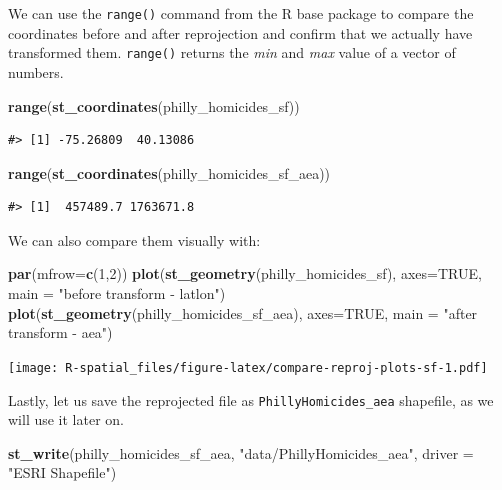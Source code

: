 \documentclass[]{book}
\newenvironment{Shaded}{\begin{snugshade}}{\end{snugshade}}
\newcommand{\KeywordTok}[1]{\textcolor[rgb]{0.13,0.29,0.53}{\textbf{#1}}}
\newcommand{\DataTypeTok}[1]{\textcolor[rgb]{0.13,0.29,0.53}{#1}}
\newcommand{\DecValTok}[1]{\textcolor[rgb]{0.00,0.00,0.81}{#1}}
\newcommand{\StringTok}[1]{\textcolor[rgb]{0.31,0.60,0.02}{#1}}
\newcommand{\OtherTok}[1]{\textcolor[rgb]{0.56,0.35,0.01}{#1}}
\newcommand{\NormalTok}[1]{#1}
\begin{document}
We can use the \texttt{range()} command from the R base package to
compare the coordinates before and after reprojection and confirm that
we actually have transformed them. \texttt{range()} returns the
\emph{min} and \emph{max} value of a vector of numbers.

\begin{Shaded}
\begin{Highlighting}[]
\KeywordTok{range}\NormalTok{(}\KeywordTok{st_coordinates}\NormalTok{(philly_homicides_sf))}
\end{Highlighting}
\end{Shaded}

\begin{verbatim}
#> [1] -75.26809  40.13086
\end{verbatim}

\begin{Shaded}
\begin{Highlighting}[]
\KeywordTok{range}\NormalTok{(}\KeywordTok{st_coordinates}\NormalTok{(philly_homicides_sf_aea))}
\end{Highlighting}
\end{Shaded}

\begin{verbatim}
#> [1]  457489.7 1763671.8
\end{verbatim}

We can also compare them visually with:

\begin{Shaded}
\begin{Highlighting}[]
\KeywordTok{par}\NormalTok{(}\DataTypeTok{mfrow=}\KeywordTok{c}\NormalTok{(}\DecValTok{1}\NormalTok{,}\DecValTok{2}\NormalTok{)) }
\KeywordTok{plot}\NormalTok{(}\KeywordTok{st_geometry}\NormalTok{(philly_homicides_sf), }\DataTypeTok{axes=}\OtherTok{TRUE}\NormalTok{, }\DataTypeTok{main =} \StringTok{"before transform - latlon"}\NormalTok{)}
\KeywordTok{plot}\NormalTok{(}\KeywordTok{st_geometry}\NormalTok{(philly_homicides_sf_aea), }\DataTypeTok{axes=}\OtherTok{TRUE}\NormalTok{, }\DataTypeTok{main =} \StringTok{"after transform - aea"}\NormalTok{)}
\end{Highlighting}
\end{Shaded}

\texttt{[image: R-spatial\_files/figure-latex/compare-reproj-plots-sf-1.pdf]}

Lastly, let us save the reprojected file as
\texttt{PhillyHomicides\_aea} shapefile, as we will use it later on.

\begin{Shaded}
\begin{Highlighting}[]
\KeywordTok{st_write}\NormalTok{(philly_homicides_sf_aea, }\StringTok{"data/PhillyHomicides_aea"}\NormalTok{, }\DataTypeTok{driver =} \StringTok{"ESRI Shapefile"}\NormalTok{)}
\end{Highlighting}
\end{Shaded}
\end{document}
